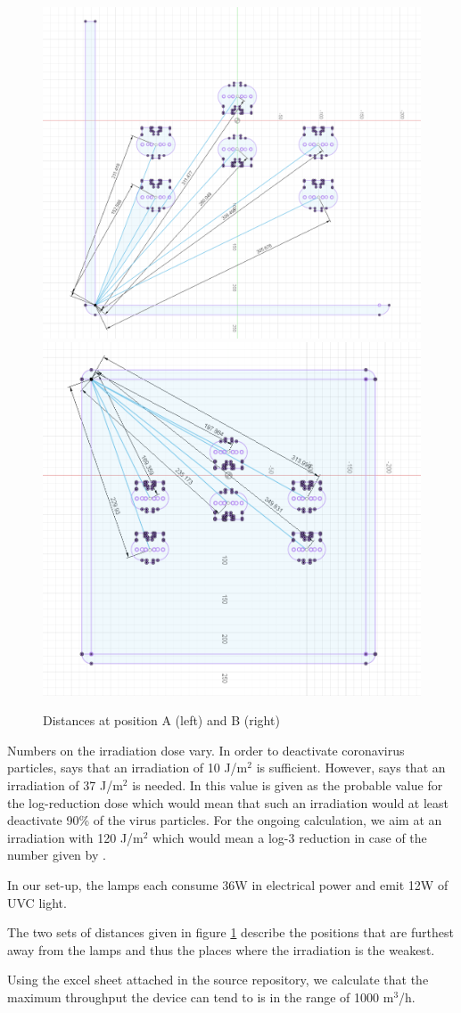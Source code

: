 \documentclass[12pt]{article}
\begin{document}
\begin{figure}
   \centering
   \includegraphics[width=0.45\linewidth]{images/PosA.png} %
   \includegraphics[width=0.45\linewidth]{images/PosB.png} %
   \caption{Distances at position A (left) and B (right)}
   \label{fig:distances}
\end{figure}

Numbers on the irradiation dose vary. 
In order to deactivate coronavirus particles, \cite {ozog}  says that an irradiation of 10 J/m$^2$ is sufficient. However, \cite{bianco} says that an irradiation of 37 J/m$^2$ is needed. In \cite{hessling} this value is given as the probable value for the log-reduction dose which would mean that such an irradiation would at least deactivate 90\% of the virus particles. For the ongoing calculation, we aim at an irradiation with 120 J/m$^2$ which would mean a log-3 reduction in case of the number given by \cite{hessling}.

In our set-up, the lamps each consume 36W in electrical power and emit 12W of UVC light.

The two sets of distances given in figure \ref{fig:distances} describe the positions that are furthest away from the lamps and thus the places where the irradiation is the weakest.

Using the excel sheet attached in the source repository, we calculate that the maximum throughput the device can tend to is in the range of 1000 m$^3$/h.
\end{document}
